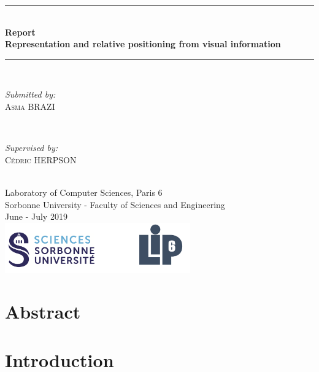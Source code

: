 \documentclass[12pt]{report}
\begin{document}
	\begin{titlepage}
		
		\newcommand{\HRule}{\rule{\linewidth}{0.5mm}} %
		
		\center 
		\HRule \\[0.4cm]
		{ \huge \bfseries Report \\Representation and relative positioning from visual information}\\[0.4cm]
		\HRule \\[1.5cm]
		
		\begin{minipage}{0.4\textwidth}
			\begin{flushleft} \large
				\emph{Submitted by:}\\
				\textsc{Asma BRAZI}
			\end{flushleft}
		\end{minipage}
		~
		\begin{minipage}{0.4\textwidth}
			\begin{flushright} \large
				\emph{Supervised by:} \\
				\textsc{Cédric HERPSON}\\
			\end{flushright}
		\end{minipage}\\[4cm]
		
		
		{\large Laboratory of Computer Sciences, Paris 6 \\ Sorbonne University - Faculty of Sciences and Engineering}\\[3cm] 
		{\large June - July 2019 }\\[3cm] 
		\includegraphics[width=0.6\textwidth]{res/logo.png}\\[1cm] 
		\vfill %
		
	\end{titlepage}
	\tableofcontents
	\chapter{Abstract}
	\chapter{Introduction}
\end{document}
